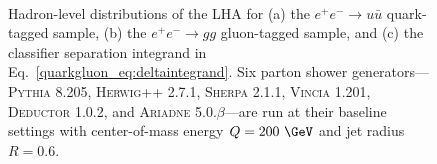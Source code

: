 \documentclass[11pt]{cernrep}
\begin{document}
\begin{figure}
\centering
{}
$\qquad$

\caption{Hadron-level distributions of the LHA for (a) the $e^+ e^- \to u \bar{u}$ quark-tagged sample, (b) the $e^+ e^- \to gg$ gluon-tagged sample, and (c) the classifier separation integrand in Eq.~\eqref{quarkgluon_eq:deltaintegrand}.  Six parton shower generators---\textsc{Pythia 8.205}, \textsc{Herwig++ 2.7.1}, \textsc{Sherpa 2.1.1}, \textsc{Vincia 1.201}, \textsc{Deductor 1.0.2}, and \textsc{Ariadne 5.0.$\beta$}---are run at their baseline settings with center-of-mass energy $Q = 200~\GeV$ and jet radius $R= 0.6$.}
\label{quarkgluon_fig:LHA_hadron}
\end{figure}
\end{document}
